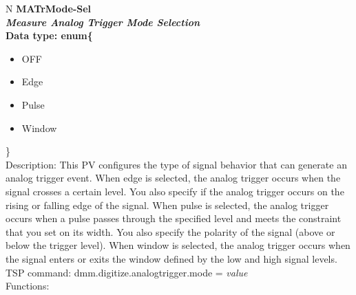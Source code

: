 \documentclass[openany]{article}
\begin{document}
		\begin{tabular}{N}
			\hline
			\bfseries MATrMode-Sel\label{pv:matrmode-sel} \\ \hline
			\emph{Measure Analog Trigger Mode Selection} \\
			Data type: enum\{\begin{itemize}[noitemsep]
				\small
				\item[] OFF
				\item[] Edge
				\item[] Pulse
				\item[] Window
			\end{itemize}\} \\
			Description: This PV configures the type of signal behavior that can generate an analog trigger event. When edge is selected, the analog trigger occurs when the signal crosses a certain level. You also specify if the analog trigger occurs on the rising or falling edge of the signal. When pulse is selected, the analog trigger occurs when a pulse passes through the specified level and meets the constraint that you set on its width. You also specify the polarity of the signal (above or below the trigger level). When window is selected, the analog trigger occurs when the signal enters or exits the window defined by the low and high signal levels. \\
			TSP command: dmm.digitize.analogtrigger.mode = \emph{value} \\
			Functions: \\
			\arrayrulecolor{\FuncTableBorderColor}

		\end{tabular}
\end{document}
